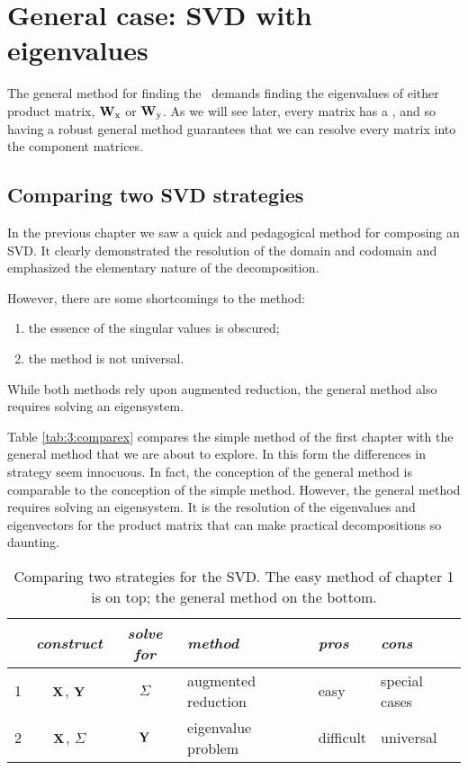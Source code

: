\chapter[SVD with eigenvalues]{General case: SVD with eigenvalues}
\label{chap:general}
The general method for finding the \svdp \ demands finding the eigenvalues of either product matrix, $\textbf{W}_{\mathrm{x}}$ or $\textbf{W}_{\mathrm{y}}$. As we will see later, every matrix has a \svdl, and so having a robust general method guarantees that we can resolve every matrix into the component matrices.

\section{Comparing two SVD strategies}
In the previous chapter we saw a quick and pedagogical method for composing an SVD. It clearly demonstrated the resolution of the domain and codomain and emphasized the elementary nature of the decomposition.

However, there are some shortcomings to the method: 
\begin{enumerate}
\item the essence of the singular values is obscured;
\item the method is not universal.
\end{enumerate}

While both methods rely upon augmented reduction, the general method also requires solving an eigensystem.

Table \eqref{tab:3:comparex} compares the simple method of the first chapter with the general method that we are about to explore. In this form the differences in strategy seem innocuous. In fact, the conception of the general method is comparable to the conception of the simple method. However, the general method requires solving an eigensystem. It is the resolution of the eigenvalues and eigenvectors for the product matrix that can make practical decompositions so daunting. 

\begin{table}[h]
\begin{center}
\begin{tabular}{l|cclll }
 & {\it construct} & {\it solve for} & {\it method} & {\it pros} & {\it cons} \\ \hline
 1 & $\textbf{X}^{\mathrm{}}$, $\textbf{Y}^{\mathrm{}}$ & $\Sigma$ & augmented reduction & easy & special cases \\[3pt]
 2 & $\textbf{X}^{\mathrm{}}$, $\Sigma$ & $\textbf{Y}^{\mathrm{}}$  & eigenvalue problem  & difficult & universal \\[3pt]\hline
\end{tabular}
\end{center}
\label{tab:3:comparex}
\caption{Comparing two strategies for the SVD. The easy method of chapter 1 is on top; the general method on the bottom.}
\end{table}%







\endinput